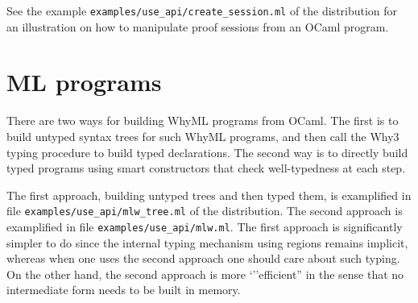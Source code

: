 See the example \verb|examples/use_api/create_session.ml| of the distribution for
an illustration on how to manipulate proof sessions from an OCaml program.

\section{ML programs}

There are two ways for building WhyML programs from OCaml. The first
is to build untyped syntax trees for such WhyML programs, and then
call the Why3 typing procedure to build typed declarations. The second
way is to directly build typed programs using smart constructors that
check well-typedness at each step.

The first approach, building untyped trees and then typed them, is
examplified in file \verb|examples/use_api/mlw_tree.ml| of the
distribution. The second approach is
examplified in file \verb|examples/use_api/mlw.ml|. The first approach
is significantly simpler to do since the internal typing mechanism
using regions remains implicit, whereas when one uses the second
approach one should care about such typing. On the other hand, the
second approach is more `''efficient'' in the sense that no
intermediate form needs to be built in memory.





